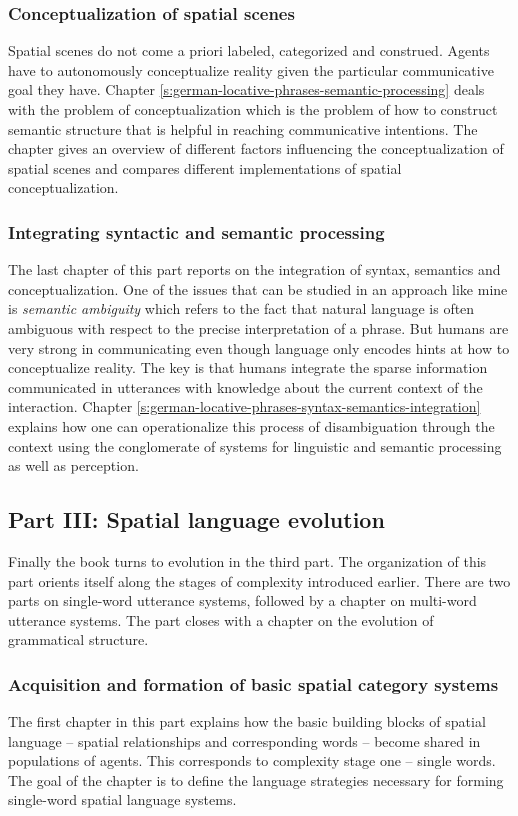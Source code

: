 \subsubsection{Conceptualization of spatial scenes}
Spatial scenes do not come a priori labeled, categorized and construed.
Agents have to autonomously conceptualize reality given the
particular communicative goal they have. 
Chapter \ref{s:german-locative-phrases-semantic-processing} deals with the problem
of conceptualization which is the problem of how to construct semantic
structure that is helpful in reaching communicative intentions. The chapter
gives an overview of different factors influencing the conceptualization
of spatial scenes and compares different implementations of 
spatial conceptualization.

\subsubsection{Integrating syntactic and semantic processing}
The last chapter of this part reports on the integration of syntax, semantics 
and conceptualization. One of the issues that can be studied in an approach
like mine is \emph{semantic ambiguity} which refers to the fact that natural
language is often ambiguous with respect to the precise interpretation
of a phrase. But humans are very strong in communicating even though 
language only encodes hints at how to conceptualize reality. The key
is that humans integrate the sparse information communicated in utterances 
with knowledge about the current context of the interaction. 
Chapter \ref{s:german-locative-phrases-syntax-semantics-integration}
explains how one can operationalize this process of disambiguation through
the context using the conglomerate of systems for linguistic and semantic
processing as well as perception.



\subsection{Part III: Spatial language evolution}
Finally the book turns to evolution in the third part. The organization of this part
orients itself along the stages of complexity introduced earlier. There are two
parts on single-word utterance systems, followed by a chapter on multi-word utterance
systems. The part closes with a chapter on the evolution of grammatical structure.

\subsubsection{Acquisition and formation of basic spatial category systems} 
The first chapter in this part explains how the basic building blocks of 
spatial language -- spatial relationships and corresponding words --  
become shared in populations of agents.
This corresponds to complexity stage one -- single words. The goal of the chapter is 
to define the language strategies necessary for forming single-word spatial language systems. 

